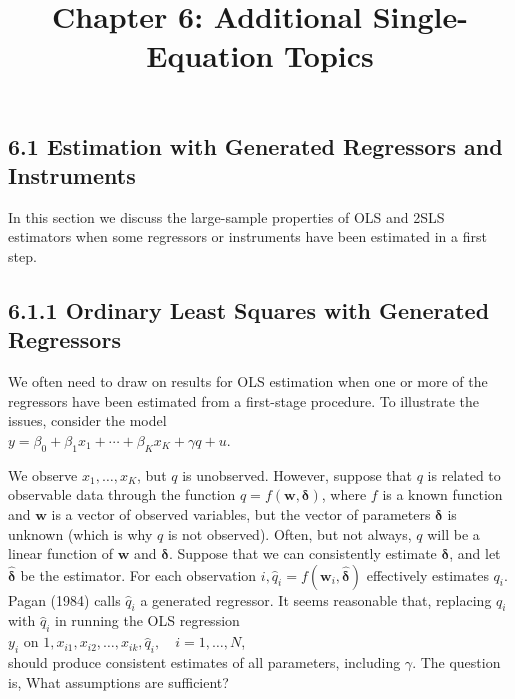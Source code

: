 \documentclass[10pt]{article}
\title{Chapter 6: Additional Single-Equation Topics}
\author{}
\date{}
\begin{document}
\maketitle

\subsection*{6.1 Estimation with Generated Regressors and Instruments}
In this section we discuss the large-sample properties of OLS and 2SLS estimators when some regressors or instruments have been estimated in a first step.

\subsection*{6.1.1 Ordinary Least Squares with Generated Regressors}
We often need to draw on results for OLS estimation when one or more of the regressors have been estimated from a first-stage procedure. To illustrate the issues, consider the model\\
$y=\beta_{0}+\beta_{1} x_{1}+\cdots+\beta_{K} x_{K}+\gamma q+u$.

We observe $x_{1}, \ldots, x_{K}$, but $q$ is unobserved. However, suppose that $q$ is related to observable data through the function $q=f(\mathbf{w}, \boldsymbol{\delta})$, where $f$ is a known function and $\mathbf{w}$ is a vector of observed variables, but the vector of parameters $\boldsymbol{\delta}$ is unknown (which is why $q$ is not observed). Often, but not always, $q$ will be a linear function of $\mathbf{w}$ and $\boldsymbol{\delta}$. Suppose that we can consistently estimate $\boldsymbol{\delta}$, and let $\hat{\boldsymbol{\delta}}$ be the estimator. For each observation $i, \hat{q}_{i}=f\left(\mathbf{w}_{i}, \hat{\boldsymbol{\delta}}\right)$ effectively estimates $q_{i}$. Pagan (1984) calls $\hat{q}_{i}$ a generated regressor. It seems reasonable that, replacing $q_{i}$ with $\hat{q}_{i}$ in running the OLS regression\\
$y_{i}$ on $1, x_{i 1}, x_{i 2}, \ldots, x_{i k}, \hat{q}_{i}, \quad i=1, \ldots, N$,\\
should produce consistent estimates of all parameters, including $\gamma$. The question is, What assumptions are sufficient?
\end{document}
